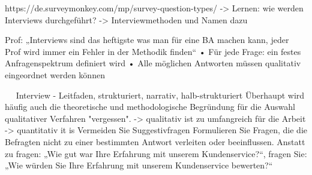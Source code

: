 https://de.surveymonkey.com/mp/survey-question-types/ 
-> Lernen: wie werden Interviews durchgeführt?
-> Interviewmethoden und Namen dazu

Prof: „Interviews sind das heftigste was man für eine BA machen kann, jeder Prof wird immer ein Fehler in der Methodik finden“
•	Für jede Frage: ein festes Anfragenspektrum definiert wird
•	Alle möglichen Antworten müssen qualitativ eingeordnet werden können

 
Interview - Leitfaden, strukturiert, narrativ, halb-strukturiert
Überhaupt wird häufig auch die theoretische und methodologische Begründung für die Auswahl qualitativer Verfahren "vergessen".
-> qualitativ ist zu umfangreich für die Arbeit
-> quantitativ it is
Vermeiden Sie Suggestivfragen
Formulieren Sie Fragen, die die Befragten nicht zu einer bestimmten Antwort verleiten oder beeinflussen. Anstatt zu fragen: „Wie gut war Ihre Erfahrung mit unserem Kundenservice?“, fragen Sie: „Wie würden Sie Ihre Erfahrung mit unserem Kundenservice bewerten?“

